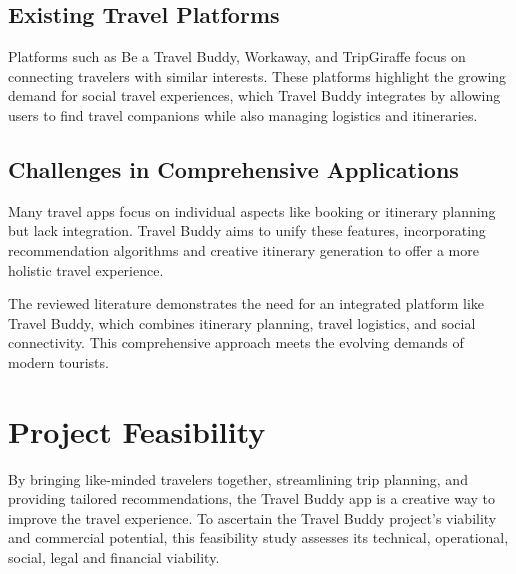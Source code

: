 \documentclass[12pt,a4paper]{report}
\begin{document}
\section{ Existing Travel Platforms}
Platforms such as Be a Travel Buddy, Workaway, and TripGiraffe focus on connecting travelers with similar interests. These platforms highlight the growing demand for social travel experiences, which Travel Buddy integrates by allowing users to find travel companions while also managing logistics and itineraries\cite{beatravelbuddy}\cite{workaway}\cite{tripgiraffe}.

\section{Challenges in Comprehensive Applications}
Many travel apps focus on individual aspects like booking or itinerary planning but lack integration. Travel Buddy aims to unify these features, incorporating recommendation algorithms and creative itinerary generation to offer a more holistic travel experience.


The reviewed literature demonstrates the need for an integrated platform like Travel Buddy, which combines itinerary planning, travel logistics, and social connectivity. This comprehensive approach meets the evolving demands of modern tourists.

\chapter{Project Feasibility}
By bringing like-minded travelers together, streamlining trip planning, and providing tailored recommendations, the Travel Buddy app is a creative way to improve the travel experience. To ascertain the Travel Buddy project's viability and commercial potential, this feasibility study assesses its technical, operational, social, legal and financial viability.
\end{document}
